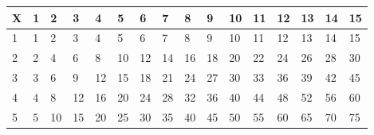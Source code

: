 \begin{table}[]
\centering
\begin{tabular}{|l|lllllllllllllll}
\hline
\multicolumn{1}{|c|}{X} & \multicolumn{1}{l|}{1} & \multicolumn{1}{l|}{2} & \multicolumn{1}{l|}{3} & \multicolumn{1}{l|}{4} & \multicolumn{1}{l|}{5} & \multicolumn{1}{l|}{6} & \multicolumn{1}{l|}{7} & \multicolumn{1}{l|}{8} & \multicolumn{1}{l|}{9} & \multicolumn{1}{l|}{10} & \multicolumn{1}{l|}{11} & \multicolumn{1}{l|}{12} & \multicolumn{1}{l|}{13} & \multicolumn{1}{l|}{14} & \multicolumn{1}{l|}{15} \\ \hline
1                       & 1                      & 2                      & 3                      & 4                      & 5                      & 6                      & 7                      & 8                      & 9                      & 10                      & 11                      & 12                      & 13                      & 14                      & 15                      \\ \cline{1-1}
2                       & 2                      & 4                      & 6                      & 8                      & 10                     & 12                     & 14                     & 16                     & 18                     & 20                      & 22                      & 24                      & 26                      & 28                      & 30                      \\ \cline{1-1}
3                       & 3                      & 6                      & 9                      & 12                     & 15                     & 18                     & 21                     & 24                     & 27                     & 30                      & 33                      & 36                      & 39                      & 42                      & 45                      \\ \cline{1-1}
4                       & 4                      & 8                      & 12                     & 16                     & 20                     & 24                     & 28                     & 32                     & 36                     & 40                      & 44                      & 48                      & 52                      & 56                      & 60                      \\ \cline{1-1}
5                       & 5                      & 10                     & 15                     & 20                     & 25                     & 30                     & 35                     & 40                     & 45                     & 50                      & 55                      & 60                      & 65                      & 70                      & 75                      \\ \cline{1-1}

\end{tabular}
\end{table}
